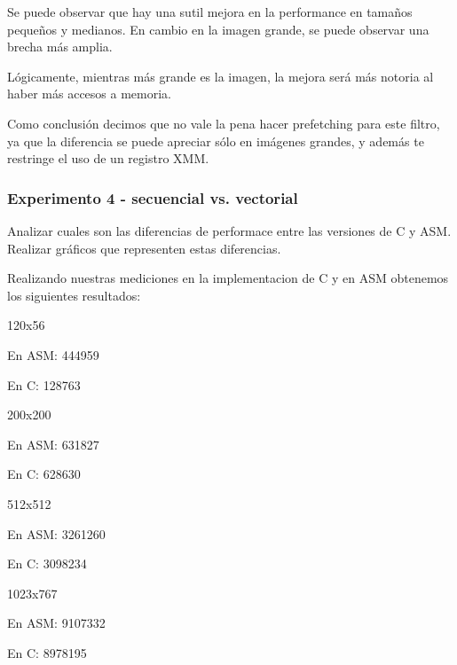   Se puede observar que hay una sutil mejora en la performance en tamaños pequeños y medianos. 
  En cambio en la imagen grande, se puede observar una brecha más amplia.\vspace*{0.2cm}



  Lógicamente, mientras más grande es la imagen, la mejora será más notoria al haber más accesos a memoria.\vspace*{0.2cm}




  Como conclusión decimos que no vale la pena hacer prefetching para este filtro,
  ya que la diferencia se puede apreciar sólo en imágenes grandes, y además te restringe el uso de un registro XMM.

\vspace*{0.3cm} \noindent
\subsubsection{Experimento 4 - secuencial vs. vectorial}

  Analizar cuales son las diferencias de performace entre las versiones de C y ASM. 
  Realizar gráficos que representen estas diferencias.

  
 Realizando nuestras mediciones en la implementacion de C y en ASM obtenemos los siguientes resultados:\vspace*{0.3cm} \noindent
 
\vspace*{0.3cm} \noindent
120x56

En ASM: 444959

En C: 128763


\vspace*{0.3cm} \noindent
200x200

En ASM: 631827

En C: 628630


\vspace*{0.3cm} \noindent
512x512

En ASM: 3261260

En C: 3098234


\vspace*{0.3cm} \noindent
1023x767

En ASM: 9107332

En C: 8978195


\vspace*{0.3cm}

